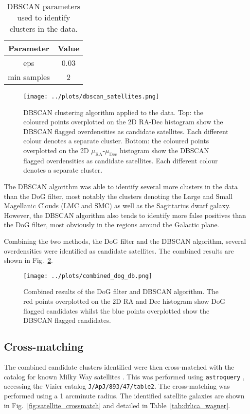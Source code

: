 \documentclass[11pt,a4paper]{article}
\begin{document}
\begin{table}[h]
    \centering
    \begin{tabular}{c|c}
    Parameter & Value \\
    \hline
    eps & 0.03 \\
    min samples & 2 \\
    \end{tabular}
    \caption{DBSCAN parameters used to identify clusters in the data.}
    \label{tab:dbscan_params}
\end{table}
\begin{figure}[h]
    \centering
    \texttt{[image: ../plots/dbscan\_satellites.png]}
    \caption{DBSCAN clustering algorithm applied to the data. Top: the coloured points overplotted on the 2D RA-Dec histogram show the DBSCAN flagged overdensities as candidate satellites. Each different colour denotes a separate cluster. Bottom: the coloured points overplotted on the 2D $\mu_{\mathrm{RA}}$-$\mu_{\mathrm{Dec}}$ histogram show the DBSCAN flagged overdensities as candidate satellites. Each different colour denotes a separate cluster.}
    \label{fig:dbscan}
\end{figure}

The DBSCAN algorithm was able to identify several more clusters in the data than the DoG filter, most notably the clusters denoting the Large and Small Magellanic Clouds (LMC and SMC) as well as the Sagittarius dwarf galaxy. However, the DBSCAN algorithm also tends to identify more false positives than the DoG filter, most obviously in the regions around the Galactic plane.

Combining the two methods, the DoG filter and the DBSCAN algorithm, several overdensities were identified as candidate satellites. The combined results are shown in Fig.~\ref{fig:combined_dog_db}.

\begin{figure}
    \centering
    \texttt{[image: ../plots/combined\_dog\_db.png]}
    \caption{Combined results of the DoG filter and DBSCAN algorithm. The red points overplotted on the 2D RA and Dec histogram show DoG flagged candidates whilst the blue points overplotted show the DBSCAN flagged candidates.}
    \label{fig:combined_dog_db}
\end{figure}

\subsection{Cross-matching}
\label{sec:crossmatch}
The combined candidate clusters identified were then cross-matched with the \citeauthor{2020ApJ...893...47D} catalog for known Milky Way satellites \citep{2020ApJ...893...47D}. This was performed using \texttt{astroquery} \citep{2019AJ....157...98G}, accessing the Vizier catalog \texttt{J/ApJ/893/47/table2}. The cross-matching was performed using a 1 arcminute radius. The identified satellite galaxies are shown in Fig.~\ref{fig:satellite_crossmatch} and detailed in Table~\ref{tab:drlica_wagner}.
\end{document}
